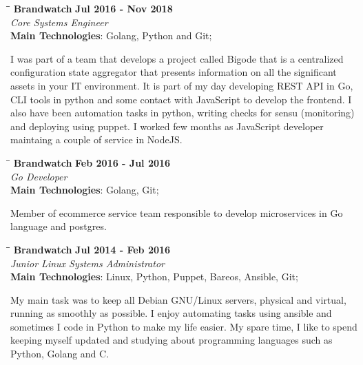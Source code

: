 \documentclass[margin]{res}
\begin{document}
\begin{resume}
\vspace{-0.1in}
   \begin{tabbing}
   \hspace{2.3in}\= \hspace{1.7in}\= \kill
    \textbf{Brandwatch}    \>\>\textbf{Jul 2016 - Nov 2018}\\
    \textit{Core Systems Engineer}\\        
    \textbf{Main Technologies}: Golang, Python and Git;
   \end{tabbing}\vspace{-20pt}
    \vspace{2mm}
I was part of a team that develops a project called Bigode that is a centralized configuration state
aggregator that presents information on all the significant assets in your IT environment. It is
part of my day developing REST API in Go, CLI tools in python and some contact with JavaScript to develop the frontend.
I also have been automation tasks in python, writing checks for sensu (monitoring) and deploying using puppet.
I worked few months as JavaScript developer maintaing a couple of service in NodeJS.

\vspace{-0.1in}
   \begin{tabbing}
   \hspace{2.3in}\= \hspace{1.7in}\= \kill
    \textbf{Brandwatch}    \>\>\textbf{Feb 2016 - Jul 2016}\\
    \textit{Go Developer}\\        
    \textbf{Main Technologies}: Golang, Git;
   \end{tabbing}\vspace{-20pt}
    \vspace{2mm}
Member of ecommerce service team responsible to develop microservices in Go language and postgres.

\vspace{-0.1in}
   \begin{tabbing}
   \hspace{2.3in}\= \hspace{1.7in}\= \kill %
    \textbf{Brandwatch}    \>\>\textbf{Jul 2014 - Feb 2016}\\
    \textit{Junior Linux Systems Administrator}\\        
    \textbf{Main Technologies}: Linux, Python, Puppet, Bareos, Ansible, Git;
   \end{tabbing}\vspace{-20pt}      %
    \vspace{2mm}
My main task was to keep all Debian GNU/Linux servers, physical and virtual, running as smoothly as possible.
I enjoy automating tasks using ansible and sometimes I code in Python to make my life easier.
My spare time, I like to spend keeping myself updated and studying about programming languages such as Python, Golang and C.



\end{resume}
\end{document}

